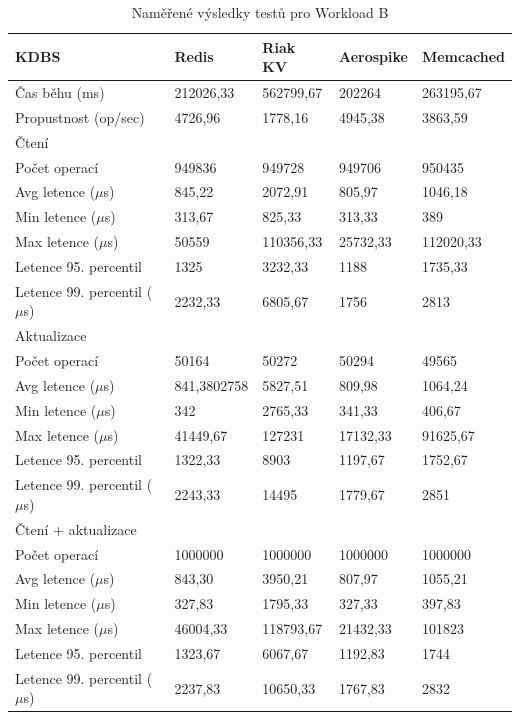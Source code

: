 \documentclass[czech,master,dept460,male,csharp,cpdeclaration]{diploma}
\begin{document}
	\begin{table}
		\centering
		\begin{tabular}{ l | l l l l }
			\toprule
			KDBS & Redis & Riak KV & Aerospike & Memcached \\
			\midrule
			Čas běhu (ms) & 212026,33 & 562799,67 & 202264 & 263195,67 \\
			Propustnost (op/sec) & 4726,96 & 1778,16 & 4945,38 & 3863,59 \\
			\midrule
			\multicolumn{5}{l}{Čtení} \\
			Počet operací & 949836 & 949728 & 949706 & 950435 \\
			Avg letence ($\mu$s) & 845,22 & 2072,91 & 805,97 & 1046,18 \\
			Min letence ($\mu$s) & 313,67 & 825,33 & 313,33 & 389 \\
			Max letence ($\mu$s) & 50559 & 110356,33 & 25732,33 & 112020,33 \\
			Letence 95. percentil & 1325 & 3232,33 & 1188 & 1735,33 \\
			Letence 99. percentil ($\mu$s) & 2232,33 & 6805,67 & 1756 & 2813 \\
			\midrule
			\multicolumn{5}{l}{Aktualizace} \\
			Počet operací & 50164 & 50272 & 50294 & 49565 \\
			Avg letence ($\mu$s) & 841,3802758 & 5827,51 & 809,98 & 1064,24 \\
			Min letence ($\mu$s) & 342 & 2765,33 & 341,33 & 406,67 \\
			Max letence ($\mu$s) & 41449,67 & 127231 & 17132,33 & 91625,67 \\
			Letence 95. percentil & 1322,33 & 8903 & 1197,67 & 1752,67 \\
			Letence 99. percentil ($\mu$s) & 2243,33 & 14495 & 1779,67 & 2851 \\
			\midrule
			\multicolumn{5}{l}{Čtení + aktualizace} \\
			Počet operací & 1000000 & 1000000 & 1000000 & 1000000 \\
			Avg letence ($\mu$s) & 843,30 & 3950,21 & 807,97 & 1055,21 \\
			Min letence ($\mu$s) & 327,83 & 1795,33 & 327,33 & 397,83 \\
			Max letence ($\mu$s) & 46004,33 & 118793,67 & 21432,33 & 101823 \\
			Letence 95. percentil & 1323,67 & 6067,67 & 1192,83 & 1744 \\
			Letence 99. percentil ($\mu$s) & 2237,83 & 10650,33 & 1767,83 & 2832 \\
			\bottomrule
		\end{tabular}
		\caption{Naměřené výsledky testů pro Workload B\label{tab_workload_b}}
	\end{table}
	
\end{document}
